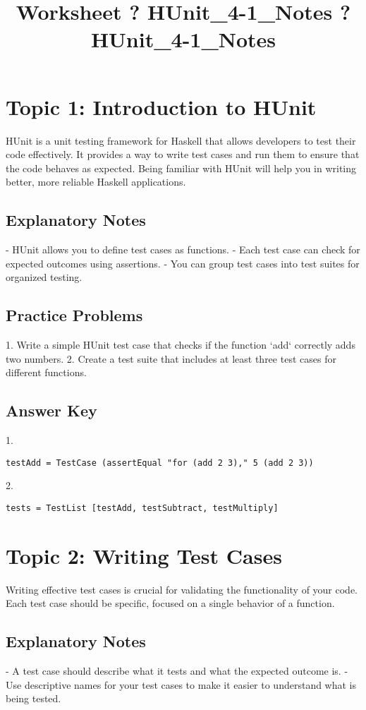 \documentclass{article}
\title{Worksheet ? HUnit\_4-1\_Notes ? HUnit\_4-1\_Notes}
\author{}
\date{}
\begin{document}
\maketitle

\section*{Topic 1: Introduction to HUnit}
HUnit is a unit testing framework for Haskell that allows developers to test their code effectively. It provides a way to write test cases and run them to ensure that the code behaves as expected. Being familiar with HUnit will help you in writing better, more reliable Haskell applications.

\subsection*{Explanatory Notes}
- HUnit allows you to define test cases as functions.
- Each test case can check for expected outcomes using assertions.
- You can group test cases into test suites for organized testing.

\subsection*{Practice Problems}
1. Write a simple HUnit test case that checks if the function `add` correctly adds two numbers.
2. Create a test suite that includes at least three test cases for different functions.

\subsection*{Answer Key}
1. 
\begin{verbatim}
testAdd = TestCase (assertEqual "for (add 2 3)," 5 (add 2 3))
\end{verbatim}
2. 
\begin{verbatim}
tests = TestList [testAdd, testSubtract, testMultiply]
\end{verbatim}

\section*{Topic 2: Writing Test Cases}
Writing effective test cases is crucial for validating the functionality of your code. Each test case should be specific, focused on a single behavior of a function.

\subsection*{Explanatory Notes}
- A test case should describe what it tests and what the expected outcome is.
- Use descriptive names for your test cases to make it easier to understand what is being tested.
\end{document}
